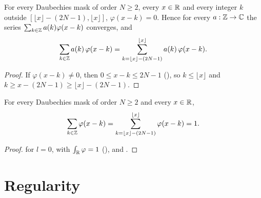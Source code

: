 \begin{lemma}
\label{lem:daub-finite-sums}
\leanok
{}
For every Daubechies mask of order $N \geq 2$, every $x \in \mathbb{R}$ and every integer $k$ outside
$[\lfloor x \rfloor - (2N - 1), \lfloor x \rfloor]$, $\varphi(x - k) = 0$. Hence for every
$a : \mathbb{Z} \to \mathbb{C}$ the series $\sum_{k \in \mathbb{Z}} a(k) \varphi(x - k)$ converges, and
\[
  \sum_{k \in \mathbb{Z}} a(k) \, \varphi(x - k)
  = \sum_{k = \lfloor x \rfloor - (2N - 1)}^{\lfloor x \rfloor} a(k) \, \varphi(x - k) .
\]
\end{lemma}

\begin{proof}
\leanok
{}
If $\varphi(x - k) \neq 0$, then $0 \leq x - k \leq 2N - 1$ (),
so $k \leq \lfloor x \rfloor$ and $k \geq x - (2N - 1) \geq \lfloor x \rfloor - (2N - 1)$.
\end{proof}

\begin{corollary}
\label{cor:daub-partition-of-unity}
\leanok
{}
For every Daubechies mask of order $N \geq 2$ and every $x \in \mathbb{R}$,
\[
  \sum_{k \in \mathbb{Z}} \varphi(x - k)
  = \sum_{k = \lfloor x \rfloor - (2N - 1)}^{\lfloor x \rfloor} \varphi(x - k) = 1 .
\]
\end{corollary}

\begin{proof}
\leanok
{}
 for $l = 0$, with $\int_{\mathbb{R}} \varphi = 1$
(), and .
\end{proof}

\section{Regularity}

